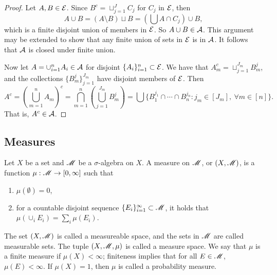 \documentclass[12pt]{article} %
\begin{document}
\begin{proof}
    Let $A, B \in \mathcal{E}$. Since $B^c = \sqcup_{j=1}^{J} C_j$ for $C_j$ in $\mathcal{E}$, then \[A \cup B = (A \setminus B) \sqcup B = \left(\bigcup A \cap C_j \right) \cup B,\] which is a finite disjoint union of members in $\mathcal{E}$. So $A \cup B \in \mathcal{A}$. This argument may be extended to show that any finite union of sets in $\mathcal{E}$ is in $\mathcal{A}$. It follows that $\mathcal{A}$ is closed under finite union.

    Now let $A = \cup_{i=1}^{n} A_i \in \mathcal{A}$ for disjoint $\{A_i\}_{i=1}^{n} \subset \mathcal{E}$. We have that $A_m^c = \sqcup_{j=1}^{J_m} B_{m}^{j}$, and the collections $\{B_{m}^{j}\}_{j=1}^{J_m}$ have disjoint members of $\mathcal{E}$. Then \[ A^c = \left( \bigcup_{m=1}^{n} A_m \right)^c = \bigcap_{m=1}^{n} \left( \bigcup_{j=1}^{J_m} B_{m}^{j} \right) = \bigcup \Big\{ B_1^{j_1} \cap \cdots \cap B_{n}^{j_n} : j_m \in [J_m], \ \forall m \in [n] \Big\}.\] That is, $A^c \in \mathcal{A}$.
\end{proof}

\subsection{Measures}

\begin{definition}
    Let $X$ be a set and $\mathscr{M}$ be a $\sigma$-algebra on $X$. A measure on $\mathscr{M}$, or $(X, \mathscr{M})$, is a function $\mu : \mathscr{M} \to [0,\infty]$ such that \begin{enumerate}
        \item $\mu(\emptyset) = 0$,
        \item for a countable disjoint sequence $\{E_i\}_{i=1}^{\infty} \subset \mathscr{M}$, it holds that $\mu\left(\cup_i E_i\right) = \sum_i \mu(E_i)$.
    \end{enumerate}
\end{definition}

\begin{definition}
    The set $(X, \mathscr{M})$ is called a measureable space, and the sets in $\mathscr{M}$ are called measurable sets. The tuple $(X, \mathscr{M}, \mu)$ is called a measure space. We say that $\mu$ is a finite measure if $\mu(X) < \infty$; finiteness implies that for all $E \in \mathscr{M}$, $\mu(E) < \infty$. If $\mu(X) = 1$, then $\mu$ is called a probability measure.
\end{definition}
\end{document}
